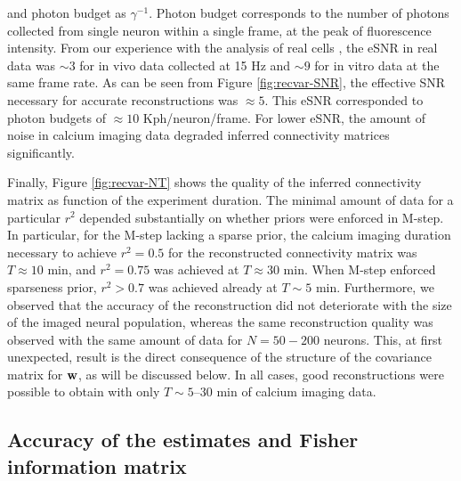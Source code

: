 \noindent and photon budget as $\gamma^{-1}$. Photon budget corresponds to the number of photons collected from single neuron within a single frame, at the peak of fluorescence intensity. From our experience with the analysis of real cells \cite{Vogelstein2009}, the eSNR in real data was $\sim 3$ for in vivo data collected at 15 Hz and $\sim 9$ for in vitro data at the same frame rate. As can be seen from Figure \ref{fig:recvar-SNR}, the effective SNR necessary for accurate reconstructions was $\approx 5$. This eSNR corresponded to photon budgets of $\approx 10$ Kph/neuron/frame. For lower eSNR, the amount of noise in calcium imaging data degraded inferred connectivity matrices significantly.

Finally, Figure \ref{fig:recvar-NT} shows the quality of the inferred connectivity matrix as function of the experiment duration. The minimal amount of data for a particular $r^2$ depended substantially on whether priors were enforced in M-step. In particular, for the M-step lacking a sparse prior, the calcium imaging duration necessary to achieve $r^2=0.5$ for the reconstructed connectivity matrix was $T\approx 10$ min, and $r^2=0.75$ was achieved at $T\approx 30$ min. When M-step enforced sparseness prior, $r^2>0.7$ was achieved already at $T\sim 5$ min. Furthermore, we observed that the accuracy of the reconstruction did not deteriorate with the size of the imaged neural population, whereas the same reconstruction quality was observed with the same amount of data for $N=50-200$ neurons. 
This, at first unexpected, result is the direct consequence of the structure of the covariance matrix for $\mathbf{w}$, as will be discussed below.
In all cases, good reconstructions were possible to obtain with only $T\sim 5$--$30$ min of calcium imaging data.


\subsection{Accuracy of the estimates and Fisher information matrix} \label{sec:methods:accuracy_Fisher}


